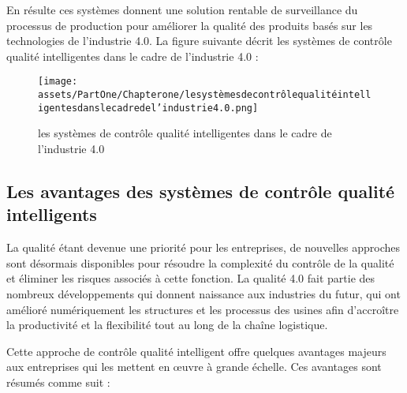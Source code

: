 En résulte ces systèmes donnent une solution rentable de surveillance du processus de production pour améliorer la qualité des produits basés sur les technologies de l'industrie 4.0. La figure suivante décrit les systèmes de contrôle qualité intelligentes dans le cadre de l’industrie 4.0 :

\begin{figure}[h]
    \centering
    \texttt{[image: assets/PartOne/Chapterone/lesystèmesdecontrôlequalitéintelligentesdanslecadredel’industrie4.0.png]}
    \caption{les systèmes de contrôle qualité intelligentes dans le cadre de l’industrie 4.0}
    \label{systemecontrolequalité}
    \end{figure}

\subsection{Les avantages des systèmes de contrôle qualité intelligents}
La qualité étant devenue une priorité pour les entreprises, de nouvelles approches sont désormais disponibles pour résoudre la complexité du contrôle de la qualité et éliminer les risques associés à cette fonction. La qualité 4.0 fait partie des nombreux développements qui donnent naissance aux industries du futur, qui ont amélioré numériquement les structures et les processus des usines afin d'accroître la productivité et la flexibilité tout au long de la chaîne logistique.

Cette approche de contrôle qualité intelligent offre quelques avantages majeurs aux entreprises qui les mettent en œuvre à grande échelle. Ces avantages sont résumés comme suit :

